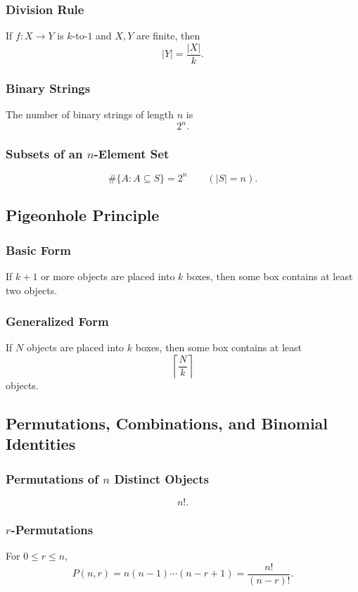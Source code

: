 \documentclass[12pt]{article}
\begin{document}
\subsubsection{Division Rule}
If \(f:X\to Y\) is \(k\)-to-\(1\) and \(X,Y\) are finite, then
\[
|Y|=\frac{|X|}{k}.
\]

\subsubsection{Binary Strings}
The number of binary strings of length \(n\) is
\[
2^n.
\]

\subsubsection{Subsets of an \(n\)-Element Set}
\[
\#\{A:A\subseteq S\}=2^n
\qquad (|S|=n).
\]

\subsection{Pigeonhole Principle}

\subsubsection{Basic Form}
If \(k+1\) or more objects are placed into \(k\) boxes, then some box contains at least two objects.

\subsubsection{Generalized Form}
If \(N\) objects are placed into \(k\) boxes, then some box contains at least
\[
\left\lceil \frac{N}{k}\right\rceil
\]
objects.

\subsection{Permutations, Combinations, and Binomial Identities}

\subsubsection{Permutations of \(n\) Distinct Objects}
\[
n!.
\]

\subsubsection{\(r\)-Permutations}
For \(0\le r\le n\),
\[
P(n,r)=n(n-1)\cdots(n-r+1)=\frac{n!}{(n-r)!}.
\]
\end{document}
